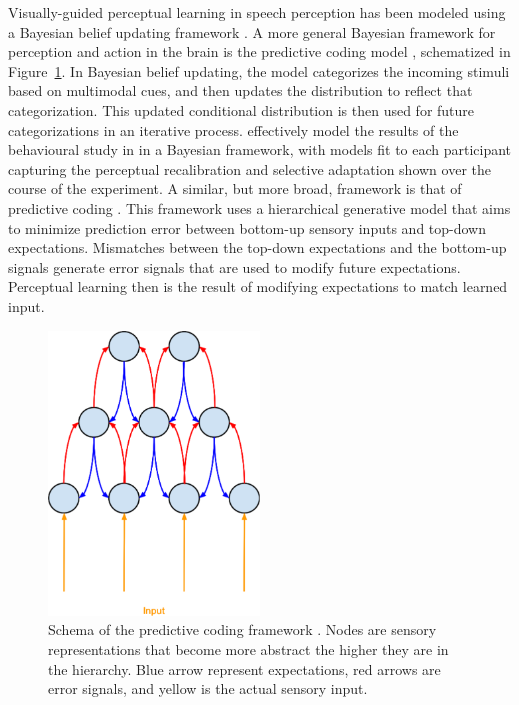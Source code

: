 Visually-guided perceptual learning in speech perception has been modeled using a Bayesian belief updating framework \citep{Kleinschmidt2011}.  
A more general Bayesian framework for perception and action in the brain is the predictive coding model \citep{Clark2013}, schematized in Figure~\ref{fig:predictivecoding}.
In Bayesian belief updating, the model categorizes the incoming stimuli based on multimodal cues, and then updates the distribution to reflect that categorization.  
This updated conditional distribution is then used for future categorizations in an iterative process.  
\citet{Kleinschmidt2011} effectively model the results of the behavioural study in \citet{Vroomen2007} in a Bayesian framework, with models fit to each participant capturing the perceptual recalibration and selective adaptation shown over the course of the experiment.  
A similar, but more broad, framework is that of predictive coding \citep{Clark2013}. 
This framework uses a hierarchical generative model that aims to minimize prediction error between bottom-up sensory inputs and top-down expectations.  
Mismatches between the top-down expectations and the bottom-up signals generate error signals that are used to modify future expectations.  
Perceptual learning then is the result of modifying expectations to match learned input.

\begin{figure}[!ht]
\caption{Schema of the predictive coding framework \citep{Clark2013}.  Nodes are sensory representations that become more abstract the higher they are in the hierarchy. Blue arrow represent expectations, red arrows are error signals, and yellow is the actual sensory input.}
\label{fig:predictivecoding}
\begin{center}
\includegraphics[width=0.5\textwidth]{pictures/predictive_coding}
\end{center}
\end{figure}

